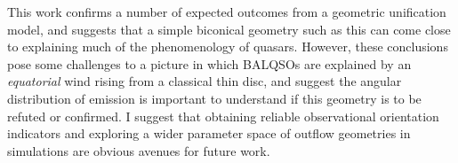This work confirms a number of expected outcomes from a geometric unification 
model, and suggests that a simple biconical geometry such as this can come close to 
explaining much of the  phenomenology of quasars. However, these conclusions pose 
some challenges to a picture in which BALQSOs are
explained by an {\em equatorial} wind rising from a classical thin disc, and suggest 
the angular distribution of emission is important to understand if this 
geometry is to be refuted or confirmed. I suggest that obtaining reliable 
observational orientation indicators and 
exploring a wider parameter space of outflow geometries in simulations
are obvious avenues for future work.